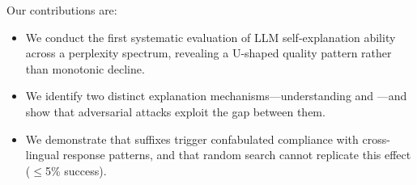 Our contributions are:
\begin{itemize}[leftmargin=*,itemsep=0pt,topsep=0pt]
    \item We conduct the first systematic evaluation of LLM self-explanation ability across a perplexity spectrum, revealing a U-shaped quality pattern rather than monotonic decline.
    \item We identify two distinct explanation mechanisms---understanding and \metarecog---and show that adversarial attacks exploit the gap between them.
    \item We demonstrate that \gcg suffixes trigger confabulated compliance with cross-lingual response patterns, and that random search cannot replicate this effect ($\leq$5\% success).
\end{itemize}
